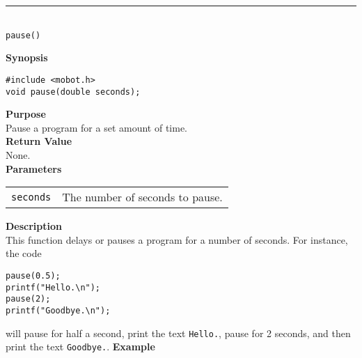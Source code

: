 \noindent
\vspace{5pt}
\rule{4.5in}{0.015in}\\
\noindent
{\LARGE \texttt{pause()}}\\
{}

\noindent
{\bf Synopsis}
\vspace{-8pt}
\begin{verbatim}
#include <mobot.h>
void pause(double seconds);
\end{verbatim}

\noindent
{\bf Purpose}\\
Pause a program for a set amount of time.\\

\noindent
{\bf Return Value}\\
None.\\

\noindent
{\bf Parameters}
\vspace{-0.1in}
\begin{description}
\item               
\begin{tabular}{p{15 mm}p{145 mm}}
\texttt{seconds} & The number of seconds to pause. \\
\end{tabular}
\end{description}

\noindent
{\bf Description}\\
This function delays or pauses a program for a number of seconds. For instance, 
the code 
\begin{verbatim}
pause(0.5);
printf("Hello.\n");
pause(2);
printf("Goodbye.\n");
\end{verbatim}
will pause for half a second, print the text \texttt{Hello.}, pause for 2 seconds,
and then print the text \texttt{Goodbye.}. 
\noindent
{\bf Example}\\


